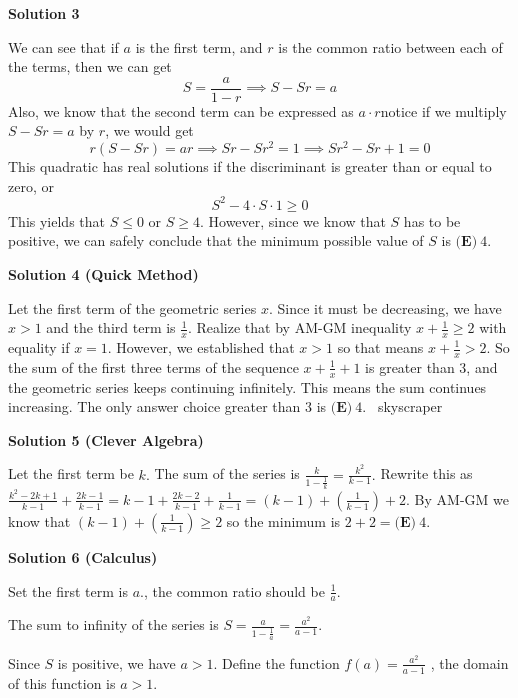 \begin{enumerate}
 



\textbf{Solution 3}

We can see that if $a$ is the first term, and $r$ is the common ratio between each of the terms, then we can get
 \[S=\frac{a}{1-r} \implies S-Sr=a\]Also, we know that the second term can be expressed as $a\cdot r$notice if we multiply $S-Sr=a$ by $r$, we would get
 \[r(S-Sr)=ar \implies Sr-Sr^2=1 \implies Sr^2-Sr+1=0\]This quadratic has real solutions if the discriminant is greater than or equal to zero, or
 \[S^2-4\cdot S \cdot 1 \ge 0\]This yields that $S\le 0$ or $S\ge 4$. However, since we know that $S$ has to be positive, we can safely conclude that the minimum possible value of $S$ is $\boxed{\textbf{(E)}\ 4}$.

 



\textbf{Solution 4 (Quick Method)}

Let the first term of the geometric series $x$. Since it must be decreasing, we have $x>1$ and the third term is $\frac{1}{x}$. Realize that by AM-GM inequality $x+\frac{1}{x} \ge 2$ with equality if $x = 1$. However, we established that $x>1$ so that means $x+\frac{1}{x} > 2$. So the sum of the first three terms of the sequence $x + \frac{1}{x} + 1$ is greater than $3$, and the geometric series keeps continuing  infinitely.  This means the sum continues increasing. The only answer choice greater than $3$ is $\boxed{\textbf{(E)}\ 4}$. ~skyscraper

 


 



\textbf{Solution 5 (Clever Algebra)}

Let the first term be $k.$ The sum of the series is $\frac{k}{1- \frac{1}{k}} =\frac{k^2}{k-1}.$ Rewrite this as $\frac{k^2-2k+1}{k-1} +\frac{2k-1}{k-1} = k-1+\frac{2k-2}{k-1} +\frac{1}{k-1} = (k-1) + \left(\frac{1}{k-1}\right) + 2.$ By AM-GM we know that $(k-1) + \left(\frac{1}{k-1}\right) \ge 2$ so the minimum is $2+2 = \boxed{\textbf{(E)}\ 4}.$




\textbf{Solution 6 (Calculus)}

Set the first term is $a.$, the common ratio should be $\frac{1}{a}.$ 

 The sum to infinity of the series is $S=\frac{a}{1-\frac{1}{a}}=\frac{a^2}{a-1}.$

 Since $S$ is positive, we have $a>1.$  Define the function $f(a)=\frac{a^2}{a-1}$ , the domain of this function is $a>1.$


\end{enumerate}
